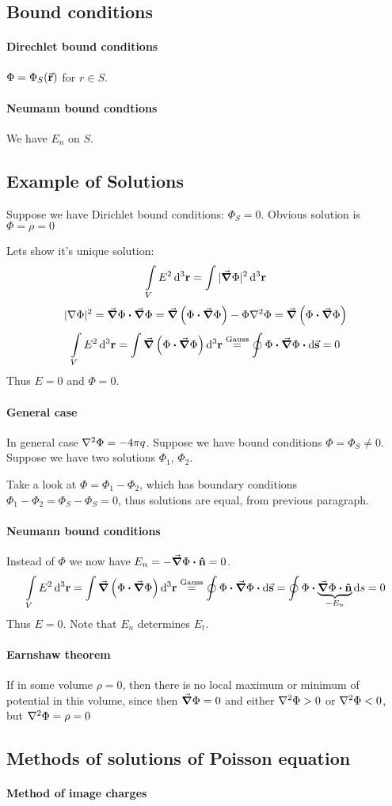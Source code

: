 \subsection{Bound conditions}
\paragraph{Direchlet bound conditions}
$\Phi = \Phi_S\qty(\va{r})$
for $r \in S$.
\paragraph{Neumann bound condtions}
We have $E_n$ on $S$.
\subsection{Example of Solutions}
Suppose we have Dirichlet bound conditions: $\Phi_S=0$. Obvious solution is $\Phi=\rho=0$

Lets show it's unique solution:
$$\int\limits_V E^2 \dd[3]{\vb{r}} = \int |\grad \Phi |^2 \dd[3]{\vb{r}} $$
$$|\nabla \Phi |^2 = \grad{\Phi} \vdot \grad{\Phi} = \grad\left(\Phi \vdot \grad{\Phi}\right) - \Phi \laplacian{\Phi}  = \grad\left(\Phi \vdot \grad{\Phi}\right)$$
$$\int\limits_V E^2 \dd[3]{\vb{r}} = \int \grad\left(\Phi \vdot \grad{\Phi}\right) \dd[3]{\vb{r}} \stackrel{\text{Gauss}}{=} \oint \Phi \vdot \grad{\Phi} \vdot \dd{\va{s}} = 0 $$
Thus $E=0$ and $\Phi=0$.
\paragraph{General case}
In general case $\laplacian{\Phi} = - 4\pi q$. Suppose we have bound conditions $\Phi = \Phi_S \neq 0$. Suppose we have two solutions $\Phi_1$, $\Phi_2$. 

Take a look at $\Phi = \Phi_1 -\Phi_2$, which has boundary conditions $\Phi_1-\Phi_2=\Phi_S-\Phi_S=0$, thus solutions are equal, from previous paragraph.
\paragraph{Neumann bound conditions}
Instead of $\Phi$ we now have $E_n =-\grad{\Phi} \vdot \vu{n} = 0 $.
$$\int\limits_V E^2 \dd[3]{\vb{r}} = \int \grad\left(\Phi \vdot \grad{\Phi}\right) \dd[3]{\vb{r}} \stackrel{\text{Gauss}}{=} \oint \Phi \vdot \grad{\Phi} \vdot \dd{\va{s}} = \oint \Phi \vdot \underbrace{\grad{\Phi} \vdot \vu{n}}_{-E_n} \dd{s} =  0 $$
Thus $E=0$. Note that $E_n$ determines $E_t$.
\paragraph{Earnshaw theorem}
If in some volume $\rho=0$, then there is no local  maximum or minimum of potential in this volume, since then $\grad{\Phi} = 0$ and either $\laplacian{\Phi} > 0$ or $\laplacian{\Phi} < 0$, but $\laplacian{\Phi} = \rho = 0$
\subsection{Methods of solutions of Poisson equation}
\paragraph{Method of image charges}
